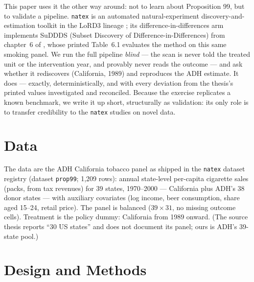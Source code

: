 \documentclass[11pt]{article}
\newcommand{\natex}{\texttt{natex}}
\begin{document}
This paper uses it the other way around: not to learn about Proposition 99,
but to validate a pipeline. \natex{} \cite{natex} is an automated
natural-experiment discovery-and-estimation toolkit in the LoRD3 lineage
\cite{herlands2018,jakubowski2023}; its difference-in-differences arm
implements SuDDDS (Subset Discovery of Difference-in-Differences) from
chapter~6 of \cite{herlands2020}, whose printed Table~6.1 evaluates the method
on this same smoking panel. We run the full pipeline \emph{blind} --- the scan
is never told the treated unit or the intervention year, and provably never
reads the outcome --- and ask whether it rediscovers (California, 1989) and
reproduces the ADH estimate. It does --- exactly, deterministically, and with
every deviation from the thesis's printed values investigated and reconciled.
Because the exercise replicates a known benchmark, we write it up short,
structurally as validation: its only role is to transfer credibility to the
\natex{} studies on novel data.

\section{Data}\label{sec:data}

The data are the ADH California tobacco panel \cite{abadie2010} as shipped in
the \natex{} dataset registry (dataset \texttt{prop99}; 1{,}209 rows): annual
state-level per-capita cigarette sales (packs, from tax revenues) for 39
states, 1970--2000 --- California plus ADH's 38 donor states --- with
auxiliary covariates (log income, beer consumption, share aged 15--24,
retail price). The panel is balanced
($39 \times 31$, no missing outcome cells). Treatment is the policy dummy:
California from 1989 onward. (The source thesis \cite{herlands2020} reports
``30 US states'' and does not document its panel; ours is ADH's 39-state
pool.)

\section{Design and Methods}\label{sec:methods}
\end{document}
